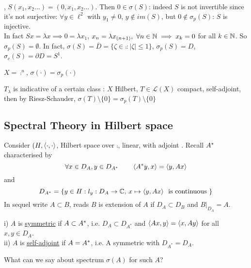 \documentclass{article}
\begin{document}
\begin{example}\nl
    , $S(x_1,x_2...)=(0,x_1,x_2...)$. Then $0\in\sigma(S)$: indeed $S$ is not invertible since it's not surjective: $\forall y\in\ell^2$ with $y_1\neq0$, $ y\notin im(S)$, but $0\notin\sigma_p(S)$: $S$ is injective.\\
    In fact $Sx=\lambda x\implies0=\lambda x_1$, $x_n=\lambda x_{(n+1)},\,\,\forall n\in\mathbb{N}\implies x_k=0$ for all $k\in\mathbb{N}$. So $\sigma_p(S)=\emptyset$. In fact, $\sigma(S)=\overline{D}=\{\zeta\in\comp:|\zeta|\leq1\}$, $\sigma_p(S)=D$, $\sigma_c(S)=\partial D=S^1$.
\end{example} 
\begin{example}\nl
    $X=\comp^n$, $\sigma(\cdot)=\sigma_p(\cdot)$
\end{example}
\begin{example}\nl
    $T_\lambda$ is indicative of a certain class : $ X$ Hilbert, $T\in\mathcal{L}(X)$ compact, self-adjoint, then by Riesz-Schauder, $\sigma(T)\setminus\{0\}=\sigma_p(T)\setminus\{0\}
    $
\end{example}

\subsection{Spectral Theory in Hilbert space}
Consider $(H,\left<{\cdot},{\cdot}\right>$, Hilbert space over $\comp$,  linear, with adjoint .
Recall ${A}^*$ characterised by $$\forall x\in D_A, y\in D_{A^*} \qquad \left<{{A}^*y},{x}\right>=\left<{y},{Ax}\right>$$ 
and 
$$D_{A^*}=\{y\in H : l_y:D_A\to \mathbb{C},\,x\mapsto \left<{y},{Ax}\right>\,\text{ is continuous }\}$$
In sequel write $A\subset B$, reads $B$ is extension of $A$ if $D_A\subset D_B$ and $B|_{D_A}=A$.


\begin{definition}\nl
	i)  $A$ is {\underline{symmetric}} if $A\subset {A}^*$, i.e. $D_A\subset D_{A^*}$ and $\left<{Ax},{y}\right>=\left<{x},{Ay}\right>$ for all $x,y\in D_A$.\\
	ii) $A$ is {\underline{self-adjoint}} if $A={A}^*$, i.e. A symmetric with $D_{A^*}=D_A$.
\end{definition}

What can we say about spectrum $\sigma(A)$ for such $A$?
\end{document}
